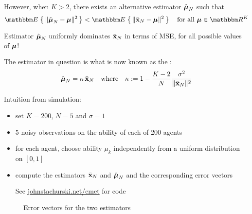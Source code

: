 \begin{frame}

    \vspace{2em}
    However, when $K > 2$,  there exists an alternative estimator
    $\hat {\boldsymbol \mu}_N$ such that
    \begin{equation}
        \label{eq:mlii}
        \EE \left\{ \, \| \hboldmu_N - \boldmu \|^2 \,  \right\}
        < \EE \left\{ \, \| \bar \boldx_N - \boldmu \|^2 \,  \right\}
        \quad
        \text{for all } \boldmu \in \RR^K
    \end{equation}
    
    Estimator $\hat {\boldsymbol \mu}_N$ uniformly dominates $\bar {{\mathbf x}}_N$ in terms of
    MSE, for all possible values of ${\boldsymbol \mu}$!  
    
    \vspace{.7em}
    The estimator in question is what
    is now known as the :
    \begin{equation*}
        \hat {\boldsymbol \mu}_N 
        = \kappa \,
        \bar {{\mathbf x}}_N
        \quad \text{where} \quad
        \kappa :=
            1 - \frac{K - 2 }{N} \frac{\sigma^2}{ \| \bar {{\mathbf x}}_N \|^2}
    \end{equation*}
    
\end{frame}


\begin{frame}

    \vspace{2em}
    Intuition from simulation:
    \begin{itemize}
        \item set $K=200$, $N=5$ and
    $\sigma=1$
        \item 5 noisy observations on the ability of each of 200 agents
        \item for each agent, choose ability $\mu_k$ independently 
                from a uniform distribution on $[0, 1]$
        \item compute the estimators $\bar
    {{\mathbf x}}_N$ and $\hat {\boldsymbol \mu}_N$ and the corresponding error vectors
    
    See \url{johnstachurski.net/emet} for code

    \end{itemize}
    
\end{frame}

\begin{frame}

    \begin{figure}
    \centering
    \caption{\label{f:stein} Error vectors for the two estimators }
    \end{figure}
    
\end{frame}

